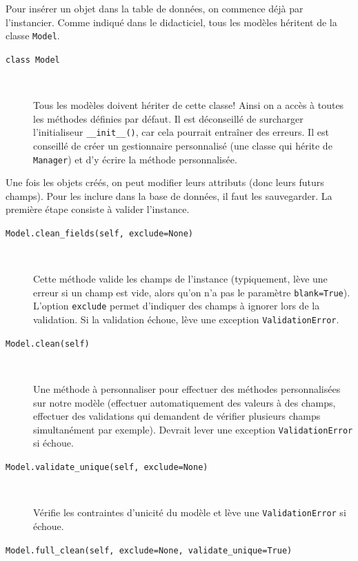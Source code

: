 \documentclass[a4paper, 10pt]{article}
\begin{document}
{Pour insérer un objet dans la table de données, on commence déjà par l'instancier. Comme indiqué dans le didacticiel, tous les modèles héritent de la classe \texttt{Model}.

\begin{description}
    \item[\texttt{class Model}]~

    Tous les modèles doivent hériter de cette classe! Ainsi on a accès à toutes les méthodes définies par défaut. Il est déconseillé de surcharger l'initialiseur \texttt{__init__()}, car cela pourrait entraîner des erreurs. Il est conseillé de créer un gestionnaire personnalisé (une classe qui hérite de \texttt{Manager}) et d'y écrire la méthode personnalisée.
\end{description}

Une fois les objets créés, on peut modifier leurs attributs (donc leurs futurs champs). Pour les inclure dans la base de données, il faut les sauvegarder. La première étape consiste à valider l'instance.

\begin{description}
    \item[\texttt{Model.clean_fields(self, exclude=None)}]~

    Cette méthode valide les champs de l'instance (typiquement, lève une erreur si un champ est vide, alors qu'on n'a pas le paramètre \texttt{blank=True}). L'option \texttt{exclude} permet d'indiquer des champs à ignorer lors de la validation. Si la validation échoue, lève une exception \texttt{ValidationError}.

    \item[\texttt{Model.clean(self)}]~

    Une méthode à personnaliser pour effectuer des méthodes personnalisées sur notre modèle (effectuer automatiquement des valeurs à des champs, effectuer des validations qui demandent de vérifier plusieurs champs simultanément par exemple). Devrait lever une exception \texttt{ValidationError} si échoue.

    \item[\texttt{Model.validate_unique(self, exclude=None)}]~

    Vérifie les contraintes d'unicité du modèle et lève une \texttt{ValidationError} si échoue.

    \item[\texttt{Model.full_clean(self, exclude=None, validate_unique=True)}]~


\end{description}}
\end{document}
